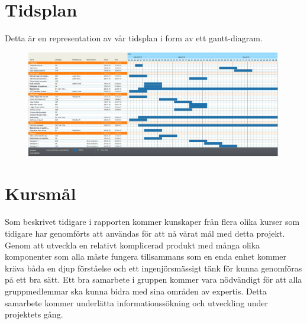 \documentclass[12pt,a4paper]{article}
\begin{document}
\section{Tidsplan}
Detta är en representation av vår tidsplan i form av ett gantt-diagram.
\begin{figure}[H]
\centering
\includegraphics[width=1.55\textwidth, angle =90]{gantt.jpg}
\end{figure} 
\pagebreak

\section{Kursmål}

Som beskrivet tidigare i rapporten kommer kunskaper från flera olika kurser som tidigare har genomförts att användas för att nå vårat mål med detta projekt. Genom att utveckla en relativt komplicerad produkt med många olika komponenter som alla måste fungera tillsammans som en enda enhet kommer kräva båda en djup förståelse och ett ingenjörsmässigt tänk för kunna genomföras på ett bra sätt.
Ett bra samarbete i gruppen kommer vara nödvändigt för att alla gruppmedlemmar ska kunna bidra med sina områden av expertis. Detta samarbete kommer underlätta informationssökning och utveckling under projektets gång.\\


\newpage
\printbibliography[title={Referenser}]
\end{document}
